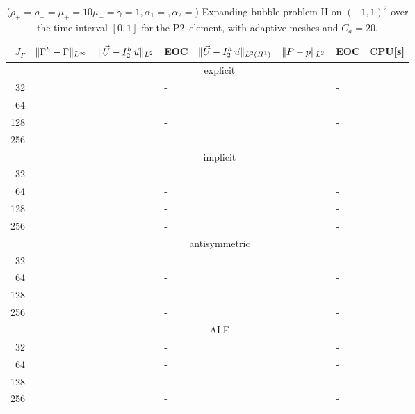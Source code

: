 \begin{table}
\center
\hspace*{-3.25cm}
\begin{tabular}{rllllllr}
\hline
$J_\Gamma$ & $\|\Gamma^h - \Gamma\|_{L^\infty}$ & $\|\vec U - I^h_{2}\,\vec u\|_{L^2}$ & EOC & $\|\vec U - I^h_{2}\,\vec u\|_{L^2(H^1)}$ & $\|P - p\|_{L^2}$ & EOC
& CPU[s] \\
\hline
& \multicolumn{7}{c}{explicit} \\
\hline
 32 & & & - & & & - & \\
 64 & & & - & & & - & \\
128 & & & - & & & - & \\
256 & & & - & & & - & \\
\hline
& \multicolumn{7}{c}{implicit} \\
\hline
 32 & & & - & & & - & \\
 64 & & & - & & & - & \\
128 & & & - & & & - & \\
256 & & & - & & & - & \\
\hline
& \multicolumn{7}{c}{antisymmetric} \\
\hline
 32 & & & - & & & - & \\
 64 & & & - & & & - & \\
128 & & & - & & & - & \\
256 & & & - & & & - & \\
\hline
& \multicolumn{7}{c}{ALE} \\
\hline
 32 & & & - & & & - & \\
 64 & & & - & & & - & \\
128 & & & - & & & - & \\
256 & & & - & & & - & \\
\hline
\end{tabular}
\hspace*{-3.25cm}
\caption[Navier--Stokes expanding bubble II errors P2--\pdg]
{($\rho_+ = \rho_- = \mu_+ = 10\mu_- = \gamma = 1,\alpha_1=,\alpha_2=$)
Expanding bubble problem II on $(-1,1)^2$ over the time interval $[0,1]$ for
the P2--\pdg element, with adaptive meshes and $C_a=20$\textdegree.}
\label{tab:nsexpandingbubbleIIp2p1dg}
\end{table}

